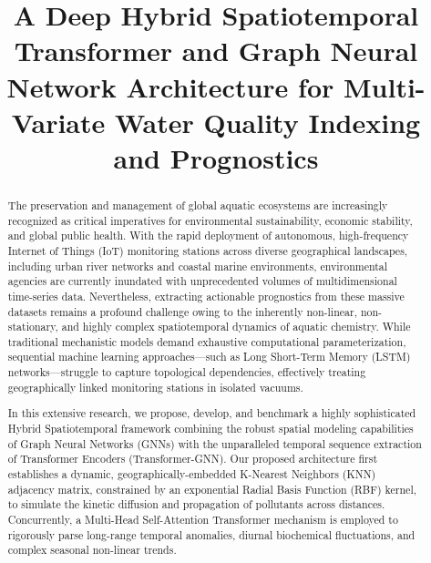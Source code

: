 \documentclass[journal,10pt,twocolumn]{IEEEtran}
\begin{document}
\title{A Deep Hybrid Spatiotemporal Transformer and Graph Neural Network Architecture for Multi-Variate Water Quality Indexing and Prognostics}

\author{
}

\maketitle

\begin{abstract}
The preservation and management of global aquatic ecosystems are increasingly recognized as critical imperatives for environmental sustainability, economic stability, and global public health. With the rapid deployment of autonomous, high-frequency Internet of Things (IoT) monitoring stations across diverse geographical landscapes, including urban river networks and coastal marine environments, environmental agencies are currently inundated with unprecedented volumes of multidimensional time-series data. Nevertheless, extracting actionable prognostics from these massive datasets remains a profound challenge owing to the inherently non-linear, non-stationary, and highly complex spatiotemporal dynamics of aquatic chemistry. While traditional mechanistic models demand exhaustive computational parameterization, sequential machine learning approaches—such as Long Short-Term Memory (LSTM) networks—struggle to capture topological dependencies, effectively treating geographically linked monitoring stations in isolated vacuums.

In this extensive research, we propose, develop, and benchmark a highly sophisticated Hybrid Spatiotemporal framework combining the robust spatial modeling capabilities of Graph Neural Networks (GNNs) with the unparalleled temporal sequence extraction of Transformer Encoders (Transformer-GNN). Our proposed architecture first establishes a dynamic, geographically-embedded K-Nearest Neighbors (KNN) adjacency matrix, constrained by an exponential Radial Basis Function (RBF) kernel, to simulate the kinetic diffusion and propagation of pollutants across distances. Concurrently, a Multi-Head Self-Attention Transformer mechanism is employed to rigorously parse long-range temporal anomalies, diurnal biochemical fluctuations, and complex seasonal non-linear trends.


\end{abstract}
\end{document}
